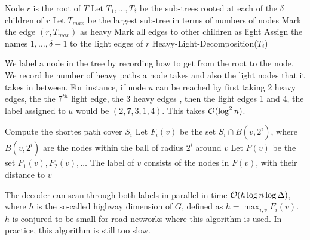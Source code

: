 \documentclass[11pt, oneside]{book}   						%
\begin{document}
\begin{algorithm}
\caption{}\label{heavy}
\begin{algorithmic}[1]
\State Node $r$ is the root of $T$
\State Let $T_1, \hdots, T_\delta$ be the sub-trees rooted at each of the $\delta$ children of $r$
\State Let $T_{max}$ be the largest sub-tree in terms of numbers of nodes
\State Mark the edge $(r,T_{max})$ as heavy
\State Mark all edges to other children as light
\State Assign the names $1, \hdots, \delta-1$ to the light edges of $r$
	\State Heavy-Light-Decomposition($T_i$)
\EndFor
\end{algorithmic}
\end{algorithm}
\begin{mythm} We label a node in the tree by recording how to get from the root to the node. We record he number of heavy paths a node takes and also the light nodes that it takes in between. For instance, if node $u$ can be reached by first taking 2 heavy edges, the the $7^{th}$ light edge, the 3 heavy edges , then the light edges 1 and 4, the label assigned to $u$ would be $(2,7,3,1,4)$. This takes $\mathcal{O}(\log^2n)$.\end{mythm}

\begin{algorithm}
\caption{}\label{hublabel}
\begin{algorithmic}[1]
	\State Compute the shortes path cover $S_i$
\EndFor
\ForEach[$v\in V$]
	\State Let $F_i(v)$ be the set $S_i\cap B(v, 2^i)$, where $B(v,2^i)$ are the nodes within the ball of radius $2^i$ around $v$
	\State Let $F(v)$ be the set $F_1(v), F_2(v),\hdots$
	\State The label of $v$ consists of the nodes in $F(v)$, with their distance to $v$
\EndForEach
\end{algorithmic}
\end{algorithm}
\begin{mythm} The decoder can scan through both labels in parallel in time $\mathcal{O}(h\log n\log \Delta)$, where $h$ is the so-called highway dimension of $G$, defined as $h=\max_{i,v}F_i(v)$. $h$ is conjured to be small for road networks where this algorithm is used. In practice, this algorithm is still too slow.\end{mythm}
\end{document}
